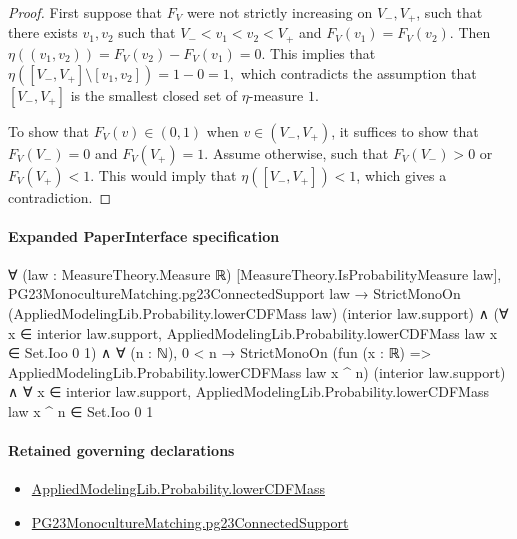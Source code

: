 \documentclass[10pt]{article}
\begin{document}
\begin{ReviewVerbatim}
\begin{proof}
First suppose that $F_V$ were not strictly increasing on $V_-, V_+$, such that there exists $v_1, v_2$ such that $V_- < v_1 < v_2 < V_+$ and $F_V(v_1) = F_V(v_2)$. Then $\eta((v_1, v_2)) = F_V(v_2) - F_V(v_1) = 0.$ This implies that $\eta([V_-, V_+]\setminus [v_1, v_2]) = 1 - 0 = 1,$ which contradicts the assumption that $[V_-, V_+]$ is the smallest closed set of $\eta$-measure $1$.

To show that $F_V(v)\in (0,1)$ when $v\in (V_-, V_+)$, it suffices to show that $F_V(V_-)=0$ and $F_V(V_+)=1.$ Assume otherwise, such that $F_V(V_-) > 0$ or $F_V(V_+) < 1.$ This would imply that $\eta([V_-, V_+]) < 1$, which gives a contradiction.
\end{proof}
\end{ReviewVerbatim}



\paragraph{Expanded PaperInterface specification}
\begin{ReviewVerbatim}
∀ (law : MeasureTheory.Measure ℝ) [MeasureTheory.IsProbabilityMeasure law],
  PG23MonocultureMatching.pg23ConnectedSupport law →
    StrictMonoOn (AppliedModelingLib.Probability.lowerCDFMass law) (interior law.support) ∧
      (∀ x ∈ interior law.support, AppliedModelingLib.Probability.lowerCDFMass law x ∈ Set.Ioo 0 1) ∧
        ∀ (n : ℕ),
          0 < n →
            StrictMonoOn (fun (x : ℝ) => AppliedModelingLib.Probability.lowerCDFMass law x ^ n) (interior law.support) ∧
              ∀ x ∈ interior law.support, AppliedModelingLib.Probability.lowerCDFMass law x ^ n ∈ Set.Ioo 0 1
\end{ReviewVerbatim}

\paragraph{Retained governing declarations}
\begin{itemize}\raggedright
\item \hyperlink{governing-declaration-5dfc240c860659bf}{Applied\allowbreak{}Modeling\allowbreak{}Lib.\allowbreak{}Probability.\allowbreak{}lower\allowbreak{}CDF\allowbreak{}Mass}
\item \hyperlink{paper-prerequisite-3ea91dd17eec5e64}{PG23\allowbreak{}Monoculture\allowbreak{}Matching.\allowbreak{}pg23\allowbreak{}Connected\allowbreak{}Support}
\end{itemize}
\end{document}
